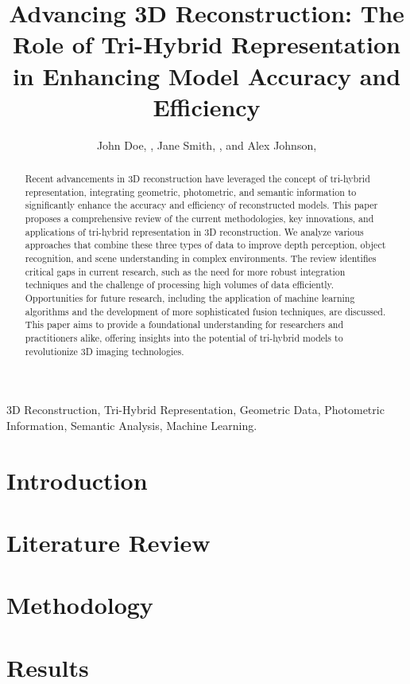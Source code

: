 \documentclass[10pt,journal,compsoc]{IEEEtran}
\title{Advancing 3D Reconstruction: The Role of Tri-Hybrid Representation in Enhancing Model Accuracy and Efficiency}
\author{John Doe, \IEEEmembership{Member, IEEE}, Jane Smith, \IEEEmembership{Fellow, OSA}, and Alex Johnson, \IEEEmembership{Member, IEEE}}
\begin{document}
\maketitle

\begin{abstract}
Recent advancements in 3D reconstruction have leveraged the concept of tri-hybrid representation, integrating geometric, photometric, and semantic information to significantly enhance the accuracy and efficiency of reconstructed models. This paper proposes a comprehensive review of the current methodologies, key innovations, and applications of tri-hybrid representation in 3D reconstruction. We analyze various approaches that combine these three types of data to improve depth perception, object recognition, and scene understanding in complex environments. The review identifies critical gaps in current research, such as the need for more robust integration techniques and the challenge of processing high volumes of data efficiently. Opportunities for future research, including the application of machine learning algorithms and the development of more sophisticated fusion techniques, are discussed. This paper aims to provide a foundational understanding for researchers and practitioners alike, offering insights into the potential of tri-hybrid models to revolutionize 3D imaging technologies.
\end{abstract}

\begin{IEEEkeywords}
3D Reconstruction, Tri-Hybrid Representation, Geometric Data, Photometric Information, Semantic Analysis, Machine Learning.
\end{IEEEkeywords}

\section{Introduction}


\section{Literature Review}


\section{Methodology}


\section{Results}

\end{document}
